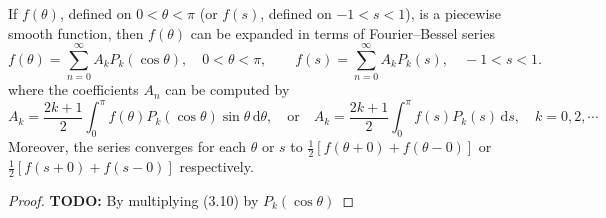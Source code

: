 \begin{theorem}[]
If $f(\theta)$, defined on $0<\theta<\pi$ (or $f(s)$, defined on $-1<s<1$), is a piecewise smooth function, then $f(\theta)$ can be expanded in terms of Fourier--Bessel series
$$
    f(\theta)=\sum_{n=0}^{\infty} A_k P_k(\cos \theta),\quad 0<\theta<\pi, \qquad f(s)=\sum_{n=0}^{\infty} A_k P_k(s),\quad -1<s<1.
$$
where the coefficients $A_n$ can be computed by
\begin{equation}\label{eq.Legendre_formula_coef}
    A_k = \frac{2k+1}{2}\int_0^\pi f(\theta)P_k(\cos\theta) \sin\theta\, \mathrm{d}\theta,\quad \textrm{or}\quad A_k = \frac{2k+1}{2}\int_0^\pi f(s)P_k(s) \, \mathrm{d}s, \quad k=0,2, \cdots
\end{equation}
Moreover, the series converges for each $\theta$ or $s$ to $\frac{1}{2}[f(\theta+0)+f(\theta-0)]$ or $\frac{1}{2}[f(s+0)+f(s-0)]$ respectively.
\end{theorem}
\begin{proof}
    \textbf{TODO: } By multiplying (3.10) by $P_k(\cos\theta)$
\end{proof}

